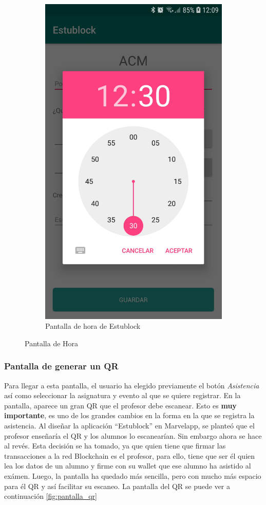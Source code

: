\begin{figure}[hbt]
\begin{subfigure}[b]{0.4\linewidth}
        \includegraphics[width=0.7\linewidth]{figs/Desarrollo/Interfaz/estublock_crear_evento_hora}
        \caption[Estublock Hora]{Pantalla de hora de Estublock}
	\end{subfigure} 
	\caption[Pantalla de Hora]{Pantalla de Hora}
	\label{fig:pantalla_hora}
\end{figure}

\subsubsection{Pantalla de generar un QR}

Para llegar a esta pantalla, el usuario ha elegido previamente el botón \textit{Asistencia} así como seleccionar la asignatura y evento al que se quiere registrar. En la pantalla, aparece un gran QR que el profesor debe escanear. Esto es \textbf{muy importante}, es uno de los grandes cambios en la forma en la que se registra la asistencia. Al diseñar la aplicación ``Estublock'' en Marvelapp, se planteó que el profesor enseñaría el QR y los alumnos lo escanearían. Sin embargo ahora se hace al revés. Esta decisión se ha tomado, ya que quien tiene que firmar las transacciones a la red Blockchain es el profesor, para ello, tiene que ser él quien lea los datos de un alumno y firme con su wallet que ese alumno ha asistido al exámen. Luego, la pantalla ha quedado más sencilla, pero con mucho más espacio para él QR y así facilitar su escaneo. La pantalla del QR se puede ver a continuación \ref{fig:pantalla_qr}

